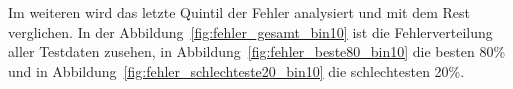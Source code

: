 \documentclass[pdftex,a4paper,halfparskip, article]{scrartcl}
\begin{document}

Im weiteren wird das letzte Quintil der Fehler analysiert und mit dem Rest verglichen. In der Abbildung~\ref{fig:fehler_gesamt_bin10} ist die Fehlerverteilung aller Testdaten zusehen, in Abbildung~\ref{fig:fehler_beste80_bin10} die besten 80\% und in Abbildung~\ref{fig:fehler_schlechteste20_bin10} die schlechtesten 20\%. 
\end{document}
